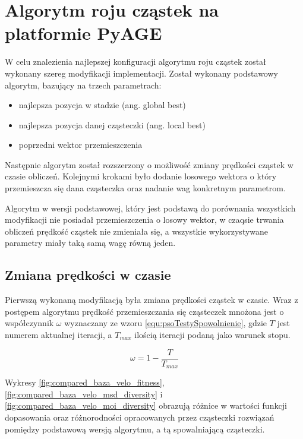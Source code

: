 \chapter{Algorytm roju cząstek na platformie PyAGE}
\label{cha:psoTesty}

W celu znalezienia najlepszej konfiguracji algorytmu roju cząstek został wykonany szereg modyfikacji implementacji. Został wykonany podstawowy algorytm, bazujący na trzech parametrach:
\begin{itemize}
\item najlepsza pozycja w stadzie (ang. global best) 
\item najlepsza pozycja danej cząsteczki (ang. local best)
\item poprzedni wektor przemieszczenia
\end{itemize}

Następnie algorytm został rozszerzony o możliwość zmiany prędkości cząstek w czasie obliczeń. Kolejnymi krokami było dodanie losowego wektora o który przemieszcza się dana cząsteczka oraz nadanie wag konkretnym parametrom. 

Algorytm w wersji podstawowej, który jest podstawą do porównania wszystkich modyfikacji nie posiadał przemieszczenia o losowy wektor, w czaqsie trwania obliczeń prędkość cząstek nie zmieniała się, a wszystkie wykorzystywane parametry miały taką samą wagę równą jeden.


\section{Zmiana prędkości w czasie}
\label{sec:psotestyspowolnienie}

Pierwszą wykonaną modyfikacją była zmiana prędkości cząstek w czasie. Wraz z postępem algorytmu prędkość przemieszczania się cząsteczek mnożona jest o współczynnik $\omega$ wyznaczany ze wzoru \ref{equ:psoTestySpowolnienie}, gdzie $T$ jest numerem aktualnej iteracji, a $T_{max}$ ilością iteracji podaną jako warunek stopu.

\begin{equation}
\label{equ:psoTestySpowolnienie}
\omega = 1 - \frac{T}{T_{max}}
\end{equation}

Wykresy \ref{fig:compared_baza_velo_fitness}, \ref{fig:compared_baza_velo_msd_diversity} i \ref{fig:compared_baza_velo_moi_diversity} obrazują różnice w wartości funkcji dopasowania oraz różnorodności opracowanych przez cząsteczki rozwiązań pomiędzy podstawową wersją algorytmu, a tą spowalniającą cząsteczki.


